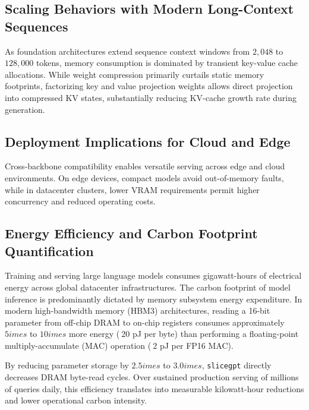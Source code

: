 \subsection{Scaling Behaviors with Modern Long-Context Sequences}
As foundation architectures extend sequence context windows from $2{,}048$ to $128{,}000$ tokens, memory consumption is dominated by transient key-value cache allocations. While weight compression primarily curtails static memory footprints, factorizing key and value projection weights allows direct projection into compressed KV states, substantially reducing KV-cache growth rate during generation.

\subsection{Deployment Implications for Cloud and Edge}
Cross-backbone compatibility enables versatile serving across edge and cloud environments. On edge devices, compact models avoid out-of-memory faults, while in datacenter clusters, lower VRAM requirements permit higher concurrency and reduced operating costs.

\subsection{Energy Efficiency and Carbon Footprint Quantification}
Training and serving large language models consumes gigawatt-hours of electrical energy across global datacenter infrastructures. The carbon footprint of model inference is predominantly dictated by memory subsystem energy expenditure. In modern high-bandwidth memory (HBM3) architectures, reading a 16-bit parameter from off-chip DRAM to on-chip registers consumes approximately $5	imes$ to $10	imes$ more energy ($~20$ pJ per byte) than performing a floating-point multiply-accumulate (MAC) operation ($~2$ pJ per FP16 MAC).

By reducing parameter storage by $2.5	imes$ to $3.0	imes$, \texttt{slicegpt} directly decreases DRAM byte-read cycles. Over sustained production serving of millions of queries daily, this efficiency translates into measurable kilowatt-hour reductions and lower operational carbon intensity.
